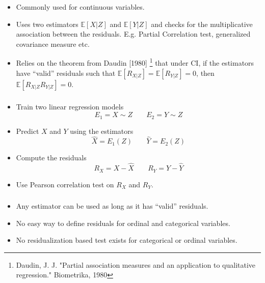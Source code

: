 \documentclass{beamer}
\begin{document}
\begin{frame}
	\frametitle{}
	\begin{itemize}
		\setlength\itemsep{1em}
		\item Commonly used for continuous variables.
		\item Uses two estimators $ \mathbb{E}[X| Z] $ and $
			\mathbb{E}[Y | Z] $ and checks for the multiplicative
			association between the residuals. E.g.
			Partial Correlation test, generalized covariance measure etc.
		\item Relies on the theorem from Daudin [1980] \footnote{Daudin, J. J. "Partial association measures and an application to qualitative regression." Biometrika, 1980}
			that under CI, if the estimators have ``valid'' residuals
			such that $ \mathbb{E}[R_{X|Z}] = \mathbb{E}[R_{Y|Z}] = 0 $,
			then $ \mathbb{E}[R_{X|Z} R_{Y|Z}] = 0 $.
	\end{itemize}
\end{frame}

\begin{frame}
	\frametitle{}
	\begin{itemize}
		\item Train two linear regression models
			$$ E_1 = X \sim Z \; \; \; \; \; \; \; E_2 = Y \sim Z $$
		\item Predict $ X $ and $ Y $ using the estimators 
			$$ \hat{X} = E_1(Z) \; \; \; \; \; \; \; \hat{Y} = E_2(Z) $$
		\item Compute the residuals
			$$ R_X = X - \hat{X} \; \; \; \; \; \; \; R_Y = Y - \hat{Y} $$
		\item Use Pearson correlation test on $ R_X $ and $ R_Y $.
	\end{itemize}
\end{frame}

\begin{frame}
	\frametitle{}
	\begin{itemize}
		\item Any estimator can be used as long as it has ``valid'' residuals.
		\item No easy way to define residuals for ordinal and categorical variables.
		\item No residualization based test exists for categorical or ordinal variables.
	\end{itemize}
\end{frame}
\end{document}
